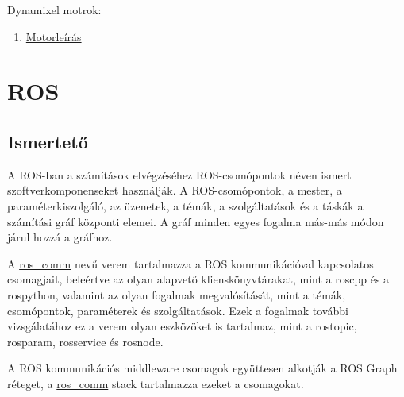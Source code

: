\documentclass{article}
\begin{document}
    Dynamixel motrok:
    \begin{enumerate}
        \item \href{https://emanual.robotis.com/docs/en/dxl/x/xl430-w250/}{Motorleírás}
    \end{enumerate}

\newpage

\section{ROS}
\subsection{Ismertető}
A ROS-ban a számítások elvégzéséhez ROS-csomópontok néven ismert szoftverkomponenseket használják. A ROS-csomópontok, a mester, a paraméterkiszolgáló, az üzenetek, a témák, a szolgáltatások és a táskák a számítási gráf központi elemei.
A gráf minden egyes fogalma más-más módon járul hozzá a gráfhoz.

A \href{http://wiki.ros.org/ros_comm}{ros\_comm} nevű verem tartalmazza a ROS kommunikációval kapcsolatos csomagjait, beleértve az olyan alapvető klienskönyvtárakat, mint a roscpp és a rospython, valamint az olyan fogalmak megvalósítását, mint a témák, csomópontok, paraméterek és szolgáltatások. Ezek a fogalmak további vizsgálatához ez a verem olyan eszközöket is tartalmaz, mint a rostopic, rosparam, rosservice és rosnode.

A ROS kommunikációs middleware csomagok együttesen alkotják a ROS Graph réteget, a \href{http://wiki.ros.org/ros_comm}{ros\_comm} stack tartalmazza ezeket a csomagokat.
\end{document}
